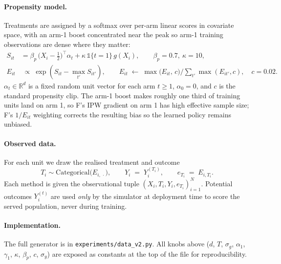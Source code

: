 \paragraph{Propensity model.}
Treatments are assigned by a softmax over per-arm linear scores in
covariate space, with an arm-1 boost concentrated near the peak so
arm-1 training observations are dense where they matter:
\begin{align}
  S_{it}   &= \beta_{p}\,\bigl(X_{i} - \tfrac{1}{2}\bigr)^{\!\top}\!\alpha_{t}
              + \kappa\,\mathbb{1}\{t = 1\}\, g(X_{i}),
  \qquad \beta_{p} = 0.7,\ \kappa = 10, \\
  E_{it}   &\;\propto\; \exp\!\left(S_{it} - \max_{t'} S_{it'}\right),
              \qquad
              E_{it} \;\leftarrow\; \max\bigl(E_{it},\, c\bigr) \big/
              {\textstyle \sum_{t'} \max(E_{it'}, c)},
              \quad c = 0.02.
\end{align}
$\alpha_{t} \in \mathbb{R}^{d}$ is a fixed random unit vector for each
arm $t \geq 1$, $\alpha_{0} = 0$, and $c$ is the standard propensity
clip.  The arm-1 boost makes roughly one third of training units land
on arm 1, so F's IPW gradient on arm 1 has high effective sample size;
F's $1/E_{it}$ weighting corrects the resulting bias so the learned
policy remains unbiased.

\paragraph{Observed data.}
For each unit we draw the realised treatment and outcome
\begin{equation}
  T_{i} \sim \mathrm{Categorical}\bigl(E_{i,\,\cdot}\bigr),
  \qquad
  Y_{i} \;=\; Y^{(T_{i})}_{i},
  \qquad
  e_{T_{i}} \;=\; E_{i,T_{i}}.
\end{equation}
Each method is given the observational tuple
$(X_{i}, T_{i}, Y_{i}, e_{T_{i}})_{i=1}^{N}$.  Potential outcomes
$Y^{(t)}_{i}$ are used \emph{only} by the simulator at deployment time
to score the served population, never during training.

\paragraph{Implementation.}
The full generator is in \texttt{experiments/data\_v2.py}.  All knobs
above ($d$, $T$, $\sigma_g$, $\alpha_{1}$, $\gamma_{1}$, $\kappa$,
$\beta_{p}$, $c$, $\sigma_y$) are exposed as constants at the top of
the file for reproducibility.
